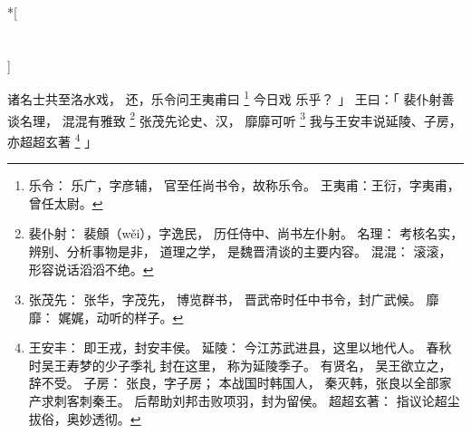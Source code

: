 
\switchcolumn[0]*[\section{}]

诸名士共至洛水戏，
还，乐令问王夷甫曰%
\footnote{%
    乐令：
        乐广，字彦辅，
        官至任尚书令，故称乐令。
    王夷甫：王衍，字夷甫，曾任太尉。
}%
    今日戏
    乐乎？
」
王曰：「
    裴仆射善谈名理，
    混混有雅致%
    \footnote{%
        裴仆射：
            裴頠（wěi），字逸民，
            历任侍中、尚书左仆射。
        名理：
            考核名实，辨别、分析事物是非，
            道理之学，
            是魏晋清谈的主要内容。
        混混：
            滚滚，形容说话滔滔不绝。
    }%
    张茂先论史、汉，
    靡靡可听%
    \footnote{%
        张茂先：
            张华，字茂先，
            博览群书，
            晋武帝时任中书令，封广武候。
        靡靡：
            娓娓，动听的样子。
    }%
    我与王安丰说延陵、子房，
    亦超超玄著%
    \footnote{%
        王安丰：
            即王戎，封安丰侯。
        延陵：
            今江苏武进县，这里以地代人。
            春秋时吴王寿梦的少子季礼
            封在这里，
            称为延陵季子。
            有贤名，
            吴王欲立之，辞不受。
        子房：
            张良，字子房；
            本战国时韩国人，
            秦灭韩，张良以全部家产求刺客刺秦王。
            后帮助刘邦击败项羽，封为留侯。
        超超玄著：
            指议论超尘拔俗，奥妙透彻。
    }%
」

\switchcolumn



